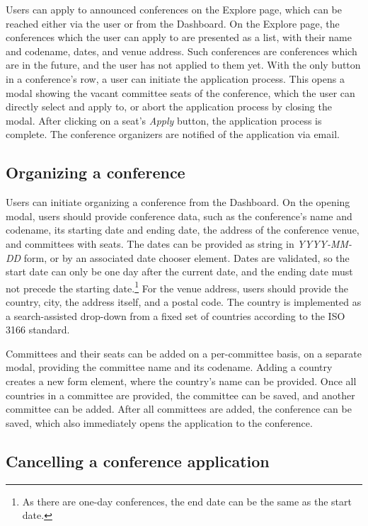 Users can apply to announced conferences on the Explore page, which can be reached either via the user or from the Dashboard. On the Explore page, the conferences which the user can apply to are presented as a list, with their name and codename, dates, and venue address. Such conferences are conferences which are in the future, and the user has not applied to them yet. With the only button in a conference's row, a user can initiate the application process. This opens a modal showing the vacant committee seats of the conference, which the user can directly select and apply to, or abort the application process by closing the modal. After clicking on a seat's \emph{Apply} button, the application process is complete. The conference organizers are notified of the application via email.

\subsection{Organizing a conference}

Users can initiate organizing a conference from the Dashboard. On the opening modal, users should provide conference data, such as the conference's name and codename, its starting date and ending date, the address of the conference venue, and committees with seats. The dates can be provided as string in \emph{YYYY-MM-DD} form, or by an associated date chooser element. Dates are validated, so the start date can only be one day after the current date, and the ending date must not precede the starting date.\footnote{As there are one-day conferences, the end date can be the same as the start date.} For the venue address, users should provide the country, city, the address itself, and a postal code. The country is implemented as a search-assisted drop-down from a fixed set of countries according to the ISO 3166 standard.

Committees and their seats can be added on a per-committee basis, on a separate modal, providing the committee name and its codename. Adding a country creates a new form element, where the country's name can be provided. Once all countries in a committee are provided, the committee can be saved, and another committee can be added. After all committees are added, the conference can be saved, which also immediately opens the application to the conference.

\subsection{Cancelling a conference application}

